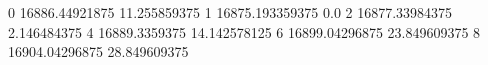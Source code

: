 0 16886.44921875 11.255859375
1 16875.193359375 0.0
2 16877.33984375 2.146484375
4 16889.3359375 14.142578125
6 16899.04296875 23.849609375
8 16904.04296875 28.849609375

